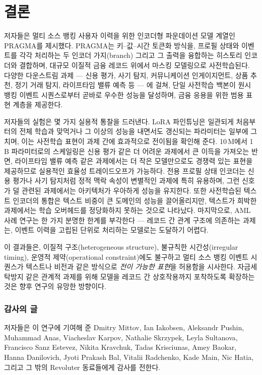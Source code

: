 \section{결론}
\label{sec:conclusion}

저자들은 멀티 소스 뱅킹 사용자 이력을 위한 인코더형 파운데이션 모델 계열인 PRAGMA를 제시했다.
PRAGMA는 키--값--시간 토큰화 방식을, 프로필 상태와 이벤트를 각각 처리하는 두 인코더 가지(branch) 그리고 그 출력을 융합하는 히스토리 인코더와 결합하며, 대규모 이질적 금융 레코드 위에서 마스킹 모델링으로 사전학습된다.
다양한 다운스트림 과제 — 신용 평가, 사기 탐지, 커뮤니케이션 인게이지먼트, 상품 추천, 정기 거래 탐지, 라이프타임 밸류 예측 등 — 에 걸쳐, 단일 사전학습 백본이 원시 뱅킹 이벤트 시퀀스로부터 곧바로 우수한 성능을 달성하며, 금융 응용을 위한 범용 표현 계층을 제공한다.

저자들의 실험은 몇 가지 실용적 통찰을 드러낸다.
LoRA 파인튜닝은 일관되게 처음부터의 전체 학습과 맞먹거나 그 이상의 성능을 내면서도 갱신되는 파라미터는 일부에 그치며, 이는 사전학습 표현이 과제 간에 효과적으로 전이됨을 확인해 준다.
10\,M에서 1\,B 파라미터로의 스케일링은 신용 평가 같은 더 어려운 과제에서 큰 이득을 가져오는 반면, 라이프타임 밸류 예측 같은 과제에서는 더 작은 모델만으로도 경쟁력 있는 표현을 제공하므로 실용적인 효율성 트레이드오프가 가능하다.
전용 프로필 상태 인코더는 신용 평가나 사기 탐지처럼 정적 맥락 속성이 변별적인 과제에 특히 유용하며, 그런 신호가 덜 관련된 과제에서는 아키텍처가 우아하게 성능을 유지한다.
또한 사전학습된 텍스트 인코더의 통합은 텍스트 비중이 큰 도메인의 성능을 끌어올리지만, 텍스트가 희박한 과제에서는 학습 오버헤드를 정당화하지 못하는 것으로 나타났다.
마지막으로, AML 사례 연구는 한 가지 분명한 한계를 부각한다 — 레코드 간 관계 구조에 의존하는 과제는, 이벤트 이력을 고립된 단위로 처리하는 모델로는 도달하기 어렵다.

이 결과들은, 이질적 구조(heterogeneous structure), 불규칙한 시간성(irregular timing), 운영적 제약(operational constraint)에도 불구하고 멀티 소스 뱅킹 이벤트 시퀀스가 텍스트나 비전과 같은 방식으로 \emph{전이 가능한 표현}을 허용함을 시사한다.
자금세탁방지 같은 관계적 과제를 위해 모델을 레코드 간 상호작용까지 포착하도록 확장하는 것은 향후 연구의 유망한 방향이다.


\subsubsection*{감사의 글}

저자들은 이 연구에 기여해 준
Dmitry Mittov,
Ian Iakobsen,
Aleksandr Pushin,
Muhammad Anas,
Viacheslav Karpov,
Nathalie Skrzypek,
Leyla Sultanova,
Francisco Sanz Estevez,
Nikita Kravchuk,
Tadas Krisciunas,
Amey Baokar,
Hanna Danilovich,
Jyoti Prakash Bal,
Vitalii Radchenko,
Kade Main,
Nic Hatia,
그리고 그 밖의 Revoluter 동료들에게 감사를 전한다.
